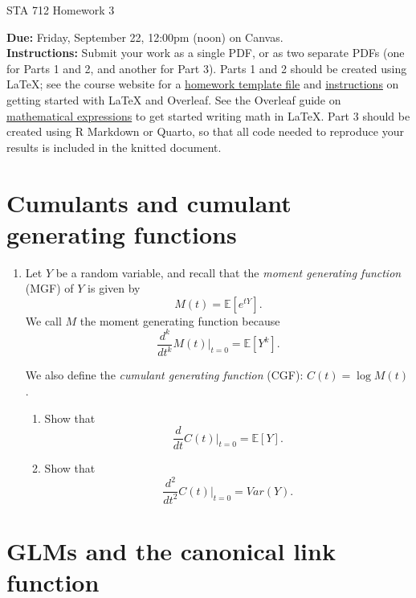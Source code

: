 \documentclass[11pt]{article}
\begin{document}
\begin{center}
\Large
STA 712 Homework 3\\
\normalsize
\vspace{5mm}
\end{center}

\noindent \textbf{Due:} Friday, September 22, 12:00pm (noon) on Canvas.\\ 

\noindent \textbf{Instructions:} Submit your work as a single PDF, or as two separate PDFs (one for Parts 1 and 2, and another for Part 3). Parts 1 and 2 should be created using LaTeX; see the course website for a \href{https://sta712-f23.github.io/homework/hw_template.tex}{homework template file} and \href{https://sta712-f23.github.io/homework/latex_instructions/}{instructions} on getting started with LaTeX and Overleaf. See the Overleaf guide on \href{https://www.overleaf.com/learn/latex/Mathematical_expressions}{mathematical expressions} to get started writing math in LaTeX. Part 3 should be created using R Markdown or Quarto, so that all code needed to reproduce your results is included in the knitted document.

\section{Cumulants and cumulant generating functions}

\begin{enumerate}
\item Let $Y$ be a random variable, and recall that the \textit{moment generating function} (MGF) of $Y$ is given by
$$M(t) = \mathbb{E}[e^{tY}].$$
We call $M$ the moment generating function because
$$ \dfrac{d^k}{dt^k} M(t) \biggr \rvert_{t=0} = \mathbb{E}[Y^k].$$

We also define the \textit{cumulant generating function} (CGF): $C(t) = \log M(t)$.

\begin{enumerate}
\item Show that
$$ \dfrac{d}{dt} C(t) \biggr \rvert_{t=0} = \mathbb{E}[Y]. $$

\item Show that
$$ \dfrac{d^2}{dt^2} C(t) \biggr \rvert_{t=0} = Var(Y). $$
\end{enumerate}
\end{enumerate}

\section{GLMs and the canonical link function}
\end{document}
